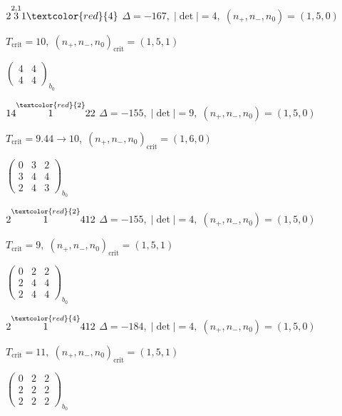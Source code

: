 \documentclass[10pt]{article}
\begin{document}
$2\overset{2,1}{3}1\textcolor{red}{4}$ \quad $\Delta=-167,\; |\det|=4,\; (n_+,n_-,n_0)=(1,5,0)$

\hspace{1em}$T_{\text{crit}}=10,\; (n_+,n_-,n_0)_{\text{crit}}=(1,5,1)$

\hspace{2em}$\left(\begin{smallmatrix}4 & 4 \\ 4 & 4\end{smallmatrix}\right)_{\!b_0}$

\smallskip

$14\overset{\textcolor{red}{2}}{1}22$ \quad $\Delta=-155,\; |\det|=9,\; (n_+,n_-,n_0)=(1,5,0)$

\hspace{1em}$T_{\text{crit}}=9.44 \to 10,\; (n_+,n_-,n_0)_{\text{crit}}=(1,6,0)$

\hspace{2em}$\left(\begin{smallmatrix}0 & 3 & 2 \\ 3 & 4 & 4 \\ 2 & 4 & 3\end{smallmatrix}\right)_{\!b_0}$

\smallskip

$2\overset{\textcolor{red}{2}}{1}412$ \quad $\Delta=-155,\; |\det|=4,\; (n_+,n_-,n_0)=(1,5,0)$

\hspace{1em}$T_{\text{crit}}=9,\; (n_+,n_-,n_0)_{\text{crit}}=(1,5,1)$

\hspace{2em}$\left(\begin{smallmatrix}0 & 2 & 2 \\ 2 & 4 & 4 \\ 2 & 4 & 4\end{smallmatrix}\right)_{\!b_0}$

$2\overset{\textcolor{red}{4}}{1}412$ \quad $\Delta=-184,\; |\det|=4,\; (n_+,n_-,n_0)=(1,5,0)$

\hspace{1em}$T_{\text{crit}}=11,\; (n_+,n_-,n_0)_{\text{crit}}=(1,5,1)$

\hspace{2em}$\left(\begin{smallmatrix}0 & 2 & 2 \\ 2 & 2 & 2 \\ 2 & 2 & 2\end{smallmatrix}\right)_{\!b_0}$
\end{document}
